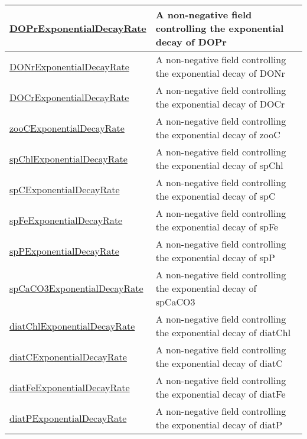 {\begin{center}
\begin{longtable}{| p{2.0in} | p{4.0in} |}
    \hline
    \hyperref[subsec:var_sec_forcing_DOPrExponentialDecayRate]{DOPrExponentialDecayRate} & A non-negative field controlling the exponential decay of DOPr \\
    \hline
    \hyperref[subsec:var_sec_forcing_DONrExponentialDecayRate]{DONrExponentialDecayRate} & A non-negative field controlling the exponential decay of DONr \\
    \hline
    \hyperref[subsec:var_sec_forcing_DOCrExponentialDecayRate]{DOCrExponentialDecayRate} & A non-negative field controlling the exponential decay of DOCr \\
    \hline
    \hyperref[subsec:var_sec_forcing_zooCExponentialDecayRate]{zooCExponentialDecayRate} & A non-negative field controlling the exponential decay of zooC \\
    \hline
    \hyperref[subsec:var_sec_forcing_spChlExponentialDecayRate]{spChlExponentialDecayRate} & A non-negative field controlling the exponential decay of spChl \\
    \hline
    \hyperref[subsec:var_sec_forcing_spCExponentialDecayRate]{spCExponentialDecayRate} & A non-negative field controlling the exponential decay of spC \\
    \hline
    \hyperref[subsec:var_sec_forcing_spFeExponentialDecayRate]{spFeExponentialDecayRate} & A non-negative field controlling the exponential decay of spFe \\
    \hline
    \hyperref[subsec:var_sec_forcing_spPExponentialDecayRate]{spPExponentialDecayRate} & A non-negative field controlling the exponential decay of spP \\
    \hline
    \hyperref[subsec:var_sec_forcing_spCaCO3ExponentialDecayRate]{spCaCO3ExponentialDecayRate} & A non-negative field controlling the exponential decay of spCaCO3 \\
    \hline
    \hyperref[subsec:var_sec_forcing_diatChlExponentialDecayRate]{diatChlExponentialDecayRate} & A non-negative field controlling the exponential decay of diatChl \\
    \hline
    \hyperref[subsec:var_sec_forcing_diatCExponentialDecayRate]{diatCExponentialDecayRate} & A non-negative field controlling the exponential decay of diatC \\
    \hline
    \hyperref[subsec:var_sec_forcing_diatFeExponentialDecayRate]{diatFeExponentialDecayRate} & A non-negative field controlling the exponential decay of diatFe \\
    \hline
    \hyperref[subsec:var_sec_forcing_diatPExponentialDecayRate]{diatPExponentialDecayRate} & A non-negative field controlling the exponential decay of diatP \\

\end{longtable}
\end{center}}

